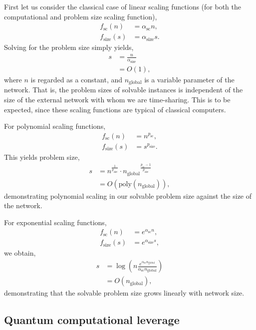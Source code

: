 First let us consider the classical case of linear scaling functions (for both the computational and problem size scaling function),
\begin{align}
	f_\text{sc}(n) &= \alpha_\text{sc} n,\nonumber\\
	f_\text{size}(s) &= \alpha_\text{size} s.
\end{align}
Solving for the problem size simply yields,
\begin{align}
s &= \frac{n}{\alpha_\text{size}} \nonumber\\
&= O(1),
\end{align}
where $n$ is regarded as a constant, and $n_\text{global}$ is a variable parameter of the network. That is, the problem sizes of solvable instances is independent of the size of the external network with whom we are time-sharing. This is to be expected, since these scaling functions are typical of classical computers.

For polynomial scaling functions,
\begin{align}
f_\text{sc}(n) &= n^{p_\text{sc}},\nonumber\\
f_\text{size}(s) &= s^{p_\text{size}}.
\end{align}
This yields problem size,
\begin{align}
	s &= n^{\frac{1}{p_\text{size}}} \cdot {n_\text{global}}^\frac{p_\text{sc}-1}{p_\text{size}} \nonumber\\
	&= O(\mathrm{poly}(n_\text{global})),
\end{align}
demonstrating polynomial scaling in our solvable problem size against the size of the network.

For exponential scaling functions,
\begin{align}
f_\text{sc}(n) &= e^{\alpha_\text{sc}n},\nonumber\\
f_\text{size}(s) &= e^{\alpha_\text{size}s},
\end{align}
we obtain,
\begin{align}
s &= \log\left(n \frac{e^{\alpha_\text{sc}n_\text{global}}}{\alpha_\text{sc}n_\text{global}}\right) \nonumber\\
&= O(n_\text{global}),
\end{align}
demonstrating that the solvable problem size grows linearly with network size.

%
%

\subsection{Quantum computational leverage}\label{sec:quant_ec_lev}


